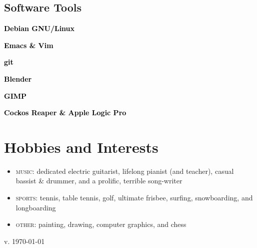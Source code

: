 \documentclass[10pt]{article}
\newcommand{\point}[1]{\textcolor{black}{\textbf{#1}}}
\newcommand\pitem[1]{\item{\point{#1}}}
\newenvironment{exper}{
\renewcommand{\labelitemi}{$\diamond$}
\vspace{-1.5em}\begin{itemize}
\setlength\itemsep{-0.2em}
}{\end{itemize}}
\begin{document}
\begin{multicols}{2}
\subsection{Software Tools}
\begin{brag}
\pitem{Debian GNU/Linux}
\pitem{Emacs \& Vim}
\pitem{git}

\pitem{Blender}
\pitem{GIMP}
\pitem{Cockos Reaper \& Apple Logic Pro}
\end{brag}
\end{multicols}
\vspace{-3em}


\section{Hobbies and Interests}
\vspace{1em}
\begin{exper}
\item \textsc{music:} dedicated electric guitarist, lifelong pianist (and teacher), casual bassist \& drummer, and a prolific, terrible song-writer
\item \textsc{sports:} tennis, table tennis, golf, ultimate frisbee, surfing, snowboarding, and longboarding
\item \textsc{other:} painting, drawing, computer graphics, and chess
\end{exper}


 \vspace{\fill} \textcolor{fade}{\small{\hfill v. \today}}
\end{document}
